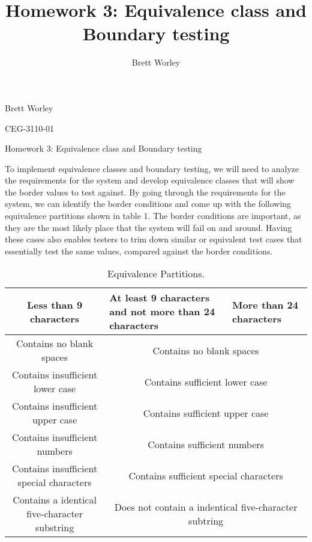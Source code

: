 \documentclass[12pt,letterpaper]{article}
\author{Brett Worley}
\title{Homework 3: Equivalence class and Boundary testing}
\begin{document}
Brett Worley

CEG-3110-01

\centerline{Homework 3: Equivalence class and Boundary testing}

To implement equivalence classes and boundary testing, we will need to analyze the requirements
for the system and develop equivalence classes that will show the border values to test against. By going through the requirements for the system, we can identify the border conditions and come up with the following equivalence partitions shown in table 1.
The border conditions are important, as they are the most likely place that the system will fail on and around.  Having these cases also enables testers to trim down similar or equivalent test cases that essentially test the same values, compared against the border conditions.

\begin{table}[h!]
  \begin{center}
    \caption{Equivalence Partitions.}
    \label{tab:table1}
    
    \begin{tabular}{||c|m{4cm}|m{5cm}||}
    \hline
    Less than 9 characters & At least 9 characters and not more than 24
    characters & More than 24 characters \\
    
    \hline \hline
    \multicolumn{1}{||c|}{Contains no blank spaces} & \multicolumn{2}{c||}{Contains no blank spaces} \\
    
    \hline \hline
    \multicolumn{1}{||c|}{Contains insufficient lower case} 
    & \multicolumn{2}{c||}{Contains sufficient lower case} \\
    
    \hline \hline
    \multicolumn{1}{||c|}{Contains insufficient upper case} 
    & \multicolumn{2}{c||}{Contains sufficient upper case} \\
    
    \hline \hline
    \multicolumn{1}{||c|}{Contains insufficient numbers} 
    & \multicolumn{2}{c||}{Contains sufficient numbers} \\
    
    \hline \hline
    \multicolumn{1}{||c|}{Contains insufficient special characters} 
    & \multicolumn{2}{c||}{Contains sufficient special characters} \\
    
    \hline \hline
    \multicolumn{1}{||c|}{Contains a identical five-character substring}
    & \multicolumn{2}{c||}{Does not contain a indentical five-character subtring} \\
    \hline
    \end{tabular}
  \end{center}
\end{table}
\end{document}
